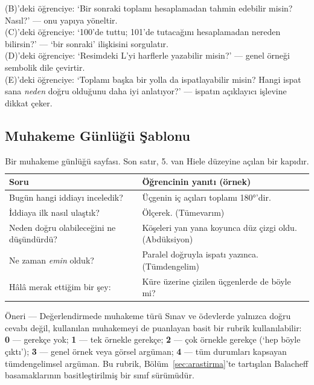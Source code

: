 \begin{sinif}
(B)’deki öğrenciye: ‘Bir sonraki toplamı hesaplamadan tahmin edebilir misin? Nasıl?’ — onu yapıya yöneltir.\\
(C)’deki öğrenciye: ‘100’de tuttu; 101’de tutacağını hesaplamadan nereden bilirsin?’ — ‘bir sonraki’ ilişkisini sorgulatır.\\
(D)’deki öğrenciye: ‘Resimdeki L’yi harflerle yazabilir misin?’ — genel örneği sembolik dile çevirtir.\\
(E)’deki öğrenciye: ‘Toplamı başka bir yolla da ispatlayabilir misin? Hangi ispat sana \emph{neden} doğru olduğunu daha iyi anlatıyor?’ — ispatın açıklayıcı işlevine dikkat çeker.
\end{sinif}

\subsection{Muhakeme Günlüğü Şablonu}

\begin{table}[h]
\centering\small
\renewcommand{\arraystretch}{1.5}
\begin{tabularx}{\linewidth}{>{\raggedright\arraybackslash}p{4.5cm}>{\raggedright\arraybackslash}X}
\toprule
\textbf{Soru} & \textbf{Öğrencinin yanıtı (örnek)}\\
\midrule
Bugün hangi iddiayı inceledik? & Üçgenin iç açıları toplamı 180°’dir.\\
İddiaya ilk nasıl ulaştık? & Ölçerek. (Tümevarım)\\
Neden doğru olabileceğini ne düşündürdü? & Köşeleri yan yana koyunca düz çizgi oldu. (Abdüksiyon)\\
Ne zaman \emph{emin} olduk? & Paralel doğruyla ispatı yazınca. (Tümdengelim)\\
Hâlâ merak ettiğim bir şey: & Küre üzerine çizilen üçgenlerde de böyle mi?\\
\bottomrule
\end{tabularx}
\caption{Bir muhakeme günlüğü sayfası. Son satır, 5. van Hiele düzeyine açılan bir kapıdır.}
\end{table}

\begin{tbox}{Öneri — Değerlendirmede muhakeme türü}
Sınav ve ödevlerde yalnızca doğru cevabı değil, kullanılan muhakemeyi de puanlayan basit bir rubrik kullanılabilir: \textbf{0} — gerekçe yok; \textbf{1} — tek örnekle gerekçe; \textbf{2} — çok örnekle gerekçe (‘hep böyle çıktı’); \textbf{3} — genel örnek veya görsel argüman; \textbf{4} — tüm durumları kapsayan tümdengelimsel argüman. Bu rubrik, Bölüm~\ref{sec:arastirma}’te tartışılan Balacheff basamaklarının basitleştirilmiş bir sınıf sürümüdür.
\end{tbox}

